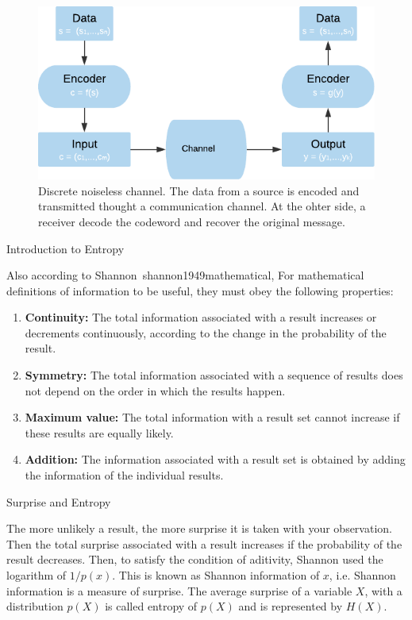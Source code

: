 \documentclass[a4paper, 12pt]{ppgeb}
\makeatletter
\renewcommand{\section}{\@startsection
{section}
{1}
{0mm}
{-\baselineskip}
{0.5\baselineskip}
{\large\bfseries\scshape}}
\renewcommand{\subsection}{\@startsection
{subsection}
{2}
{0mm}
{-\baselineskip}
{0.5\baselineskip}
{\bf\sffamily}}
\makeatother
\begin{document}
\begin{figure}[h]
	\centering
	\includegraphics[width=.8\linewidth]{communication_diagram.png}
	\caption{Discrete noiseless channel. The data from a source is  encoded and transmitted thought a communication channel. At the ohter side, a receiver decode the  codeword and recover the original message.} \label{fig_prothesis}
\end{figure}

\section{Introduction to Entropy}

Also according to Shannon~\cite{mainreferences}{shannon1949mathematical}, For mathematical definitions of information to be useful, they must obey the following properties:
\begin{enumerate}
\item \textbf{Continuity:} The total information associated with a result increases or decrements continuously, according to the change in the probability of the result.
\item \textbf{Symmetry:} The total information associated with a sequence of results does not depend on the order in which the results happen.
\item \textbf{Maximum value:} The total information with a result set cannot increase if these results are equally likely.
\item \textbf{Addition:} The information associated with a result set is obtained by adding the information of the individual results.
\end{enumerate}

\subsection{Surprise and Entropy}

The more unlikely a result, the more surprise it is taken with your observation. Then the total surprise associated with a result increases if the probability of the result decreases. Then, to satisfy the condition of aditivity, Shannon used the logarithm of \(1/p(x)\).  This is known as Shannon information of \(x\), i.e. Shannon information is a measure of surprise. The average surprise of a variable \(X\), with a distribution \(p(X)\) is called entropy of \(p(X)\) and is represented by \(H(X)\).
\end{document}
